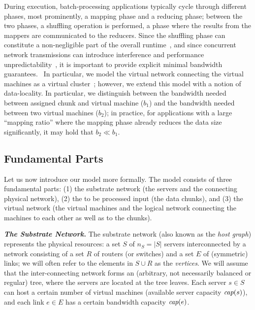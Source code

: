 \documentclass[9pt]{sigcomm-alternate}
\newcommand{\capacity}{\emph{cap}}
\newcommand{\CostTrans}{\ensuremath{b_1}}
\newcommand{\CostCom}{\ensuremath{b_2}}
\begin{document}
During execution, batch-processing applications typically cycle through different phases,
most prominently, a mapping phase and a reducing phase; between the two phases,
a shuffling operation is performed, a phase where the results from the mappers
are communicated to the reducers. Since the shuffling phase can constitute a
non-negligible part of the overall runtime~\cite{orchestra},
and since concurrent network transmissions can introduce interference and
performance unpredictability~\cite{amazonbw}, it is important
to provide explicit minimal bandwidth guarantees.~\cite{talk-about}
In particular, we model the virtual network connecting the virtual machines
as a virtual cluster~\cite{oktopus,talk-about,proteus};
however, we extend this model with a notion of data-locality.
In particular, we distinguish between the bandwidth needed between assigned chunk
and virtual machine ($\CostTrans$) and the bandwidth needed between
two virtual machines ($\CostCom$); in practice, for applications with a large
``mapping ratio'' where the mapping phase already reduces the data size significantly,
it may hold that $\CostCom\ll\CostTrans$.

\subsection{Fundamental Parts}

Let us now introduce our model more formally. The model consists of three fundamental parts: (1) the substrate network (the servers
and the connecting physical network),
(2) the to be processed input (the data chunks), and
(3) the virtual network (the virtual machines and the logical network connecting the machines to each other
as well as to the chunks).

\textbf{\emph{The Substrate Network.}} The substrate network (also known as the \emph{host graph}) represents the physical resources:
a set $S$ of $n_S=|S|$ servers interconnected by a network consisting of a set $R$ of routers (or switches)
and a set $E$ of (symmetric) links; we will often refer to the elements in $S\cup R$
as the \emph{vertices}. We will assume that the inter-connecting network forms an (arbitrary, not necessarily balanced
or regular) tree,
where the servers are located at the tree leaves.
Each server $s\in S$ can host a certain number
of virtual machines (available server capacity $\capacity(s)$), and each link $e\in E$ has a certain bandwidth
capacity $\capacity(e)$.
\end{document}
